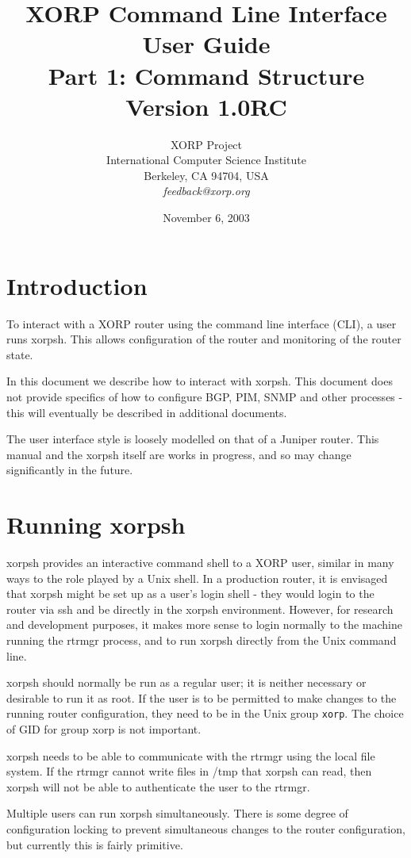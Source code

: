 \documentclass[11pt]{article}
\title{XORP Command Line Interface User Guide\\
Part 1: Command Structure \\
\vspace{1ex}
Version 1.0RC}
\author{ XORP Project					\\
	 International Computer Science Institute	\\
	 Berkeley, CA 94704, USA			\\
	 {\it feedback@xorp.org}
}
\date{November 6, 2003}
\newcommand{\xorpsh}{{\sf\small xorpsh}\xspace}
\begin{document}
\maketitle                            
\section{Introduction}
To interact with a XORP router using the command line interface (CLI),
a user runs \xorpsh.  This allows configuration of the router and
monitoring of the router state.  

In this document we describe how to interact with \xorpsh.  This
document does not provide specifics of how to configure BGP, PIM, SNMP
and other processes - this will eventually be described in additional
documents.

The user interface style is loosely modelled on that of a Juniper
router.  This manual and the xorpsh itself are works in progress, and
so may change significantly in the future.

\section{Running xorpsh}
\xorpsh provides an interactive command shell to a XORP user, similar
in many ways to the role played by a Unix shell.  In a production
router, it is envisaged that \xorpsh might be set up as a user's login
shell - they would login to the router via ssh and be directly in the
\xorpsh environment.  However, for research and development purposes,
it makes more sense to login normally to the machine running the
rtrmgr process, and to run \xorpsh directly from the Unix command line.

\xorpsh should normally be run as a regular user; it is neither
necessary or desirable to run it as root.  If the user is to be
permitted to make changes to the running router configuration, they
need to be in the Unix group {\tt xorp}.  The choice of GID for group
xorp is not important.

\xorpsh needs to be able to communicate with the rtrmgr using the local
file system.  If the rtrmgr cannot write files in /tmp that \xorpsh
can read, then \xorpsh will not be able to authenticate the user to the
rtrmgr.

Multiple users can run \xorpsh simultaneously.  There is some degree of
configuration locking to prevent simultaneous changes to the router
configuration, but currently this is fairly primitive.
\end{document}
